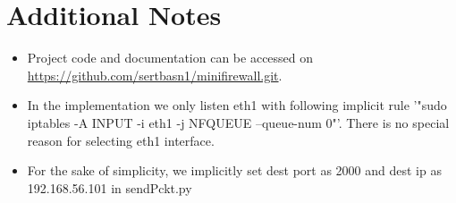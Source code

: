 \documentclass[paper=a4, fontsize=11pt]{scrartcl}
\numberwithin{equation}{section}		%
\numberwithin{figure}{section}			%
\numberwithin{table}{section}				%
\begin{document}
\section*{Additional Notes}
\begin{itemize}
\item Project code and documentation can be accessed on \url{https://github.com/sertbasn1/minifirewall.git}.
\item In the implementation we only listen eth1 with following implicit rule '"sudo iptables -A INPUT -i eth1 -j NFQUEUE --queue-num 0"'. There is no special reason for selecting eth1 interface.
\item For the sake of simplicity, we implicitly set dest port as 2000 and dest ip as 192.168.56.101 in sendPckt.py
\end{itemize}

\printbibliography
\end{document}
